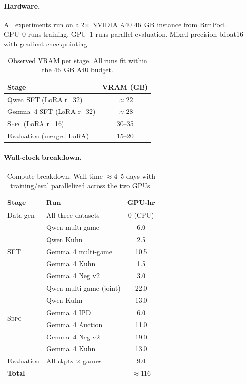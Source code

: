 \documentclass[letterpaper]{article} %
\newcommand{\sepo}{\textsc{Sepo}}
\begin{document}
\paragraph{Hardware.} All experiments run on a 2$\times$ NVIDIA A40 46~GB instance from RunPod. GPU~0 runs training, GPU~1 runs parallel evaluation. Mixed-precision bfloat16 with gradient checkpointing.
\begin{table}[h]
\centering
\small
\setlength{\tabcolsep}{4pt}
\begin{tabular}{@{}lc@{}}
\toprule
\textbf{Stage} & \textbf{VRAM (GB)} \\
\midrule
Qwen SFT (LoRA r=32)         & $\approx 22$ \\
Gemma~4 SFT (LoRA r=32)      & $\approx 28$ \\
\sepo{} (LoRA r=16)          & 30--35 \\
Evaluation (merged LoRA)     & 15--20 \\
\bottomrule
\end{tabular}
\caption{Observed VRAM per stage. All runs fit within the 46~GB A40 budget.}
\label{tab:vram}
\end{table}
\paragraph{Wall-clock breakdown.}
\begin{table}[h]
\centering
\small
\setlength{\tabcolsep}{4pt}
\begin{tabular}{@{}llc@{}}
\toprule
\textbf{Stage} & \textbf{Run} & \textbf{GPU-hr} \\
\midrule
Data gen & All three datasets & 0 (CPU) \\
\midrule
\multirow{5}{*}{SFT}
 & Qwen multi-game          & 6.0 \\
 & Qwen Kuhn                & 2.5 \\
 & Gemma~4 multi-game       & 10.5 \\
 & Gemma~4 Kuhn             & 1.5 \\
 & Gemma~4 Neg v2           & 3.0 \\
\midrule
\multirow{6}{*}{\sepo{}}
 & Qwen multi-game (joint)  & 22.0 \\
 & Qwen Kuhn                & 13.0 \\
 & Gemma~4 IPD              & 6.0 \\
 & Gemma~4 Auction          & 11.0 \\
 & Gemma~4 Neg v2           & 19.0 \\
 & Gemma~4 Kuhn             & 13.0 \\
\midrule
Evaluation & All ckpts $\times$ games & 9.0 \\
\midrule
\textbf{Total} & & \textbf{$\approx 116$} \\
\bottomrule
\end{tabular}
\caption{Compute breakdown. Wall time $\approx 4$--5 days with training/eval parallelized across the two GPUs.}
\label{tab:compute-budget}
\end{table}
\end{document}
